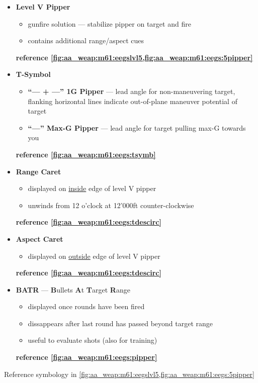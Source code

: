 \begin{tcoloritemize}
    \begin{itemize}
        \item \textbf{Level V Pipper}
        \begin{itemize}
            \item gunfire solution --- stabilize pipper on target and fire
            \item contains additional range/aspect cues
        \end{itemize}
        \textbf{reference \cref{fig:aa_weap:m61:eegslvl5,fig:aa_weap:m61:eegs:5pipper}}
        \item \textbf{T-Symbol}
        \begin{itemize}
            \item \textbf{``--- + ---'' 1G Pipper} --- lead angle for non-maneuvering target,
            flanking horizontal lines indicate out-of-plane maneuver potential of target
            \item \textbf{``---'' Max-G Pipper} --- lead angle for target pulling max-G towards you
        \end{itemize}
        \textbf{reference \cref{fig:aa_weap:m61:eegs:tsymb}}
        \item \textbf{Range Caret}
        \begin{itemize}
            \item displayed on \underline{inside} edge of level V pipper
            \item unwinds from 12 o'clock at 12'000ft counter-clockwise
        \end{itemize}
        \textbf{reference \cref{fig:aa_weap:m61:eegs:tdescirc}}
        \item \textbf{Aspect Caret} 
        \begin{itemize}
            \item displayed on \underline{outside} edge of level V pipper
        \end{itemize}
        \textbf{reference \cref{fig:aa_weap:m61:eegs:tdescirc}}
        \item \textbf{BATR} --- \textbf{B}ullets \textbf{A}t \textbf{T}arget \textbf{R}ange
        \begin{itemize}
            \item displayed once rounds have been fired
            \item dissappears after last round has passed beyond target range
            \item useful to evaluate shots (also for training)
        \end{itemize}
        \textbf{reference \cref{fig:aa_weap:m61:eegs:pipper}}
    \end{itemize}
    
    Reference symbology in \cref{fig:aa_weap:m61:eegslvl5,fig:aa_weap:m61:eegs:5pipper}
\end{tcoloritemize}

